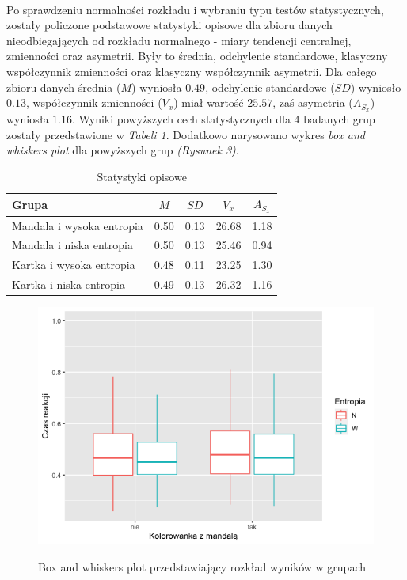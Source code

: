 \documentclass[12pt,a4paper,final,oneside,onecolumn,titlepage]{article}
\begin{document}
\paragraph{}
Po sprawdzeniu normalności rozkładu i wybraniu typu testów statystycznych, zostały policzone podstawowe statystyki opisowe dla zbioru danych nieodbiegających od rozkładu normalnego - miary tendencji centralnej, zmienności oraz asymetrii. Były to średnia, odchylenie standardowe, klasyczny współczynnik zmienności oraz klasyczny współczynnik asymetrii. Dla całego zbioru danych średnia ($M$) wyniosła $0.49$, odchylenie standardowe ($SD$) wyniosło $0.13$, współczynnik zmienności ($V_x$) miał wartość $25.57$, zaś asymetria ($A_{S_{x}}$) wyniosła $1.16$. Wyniki powyższych cech statystycznych dla 4 badanych grup zostały przedstawione w \textit{Tabeli 1}. Dodatkowo narysowano wykres \textit{box and whiskers plot} dla powyższych grup \textit{(Rysunek 3)}.
\begin{table}[H]
\caption{Statystyki opisowe}
\centering
\begin{tabular}{l c c c c}
\hline\hline
Grupa & $M$ & $SD$ & $V_x$ & $A_{S_{x}}$ \\ [0.5ex]
\hline
Mandala i wysoka entropia&0.50&0.13&26.68&1.18 \\
Mandala i niska entropia&0.50&0.13&25.46&0.94 \\
Kartka i wysoka entropia&0.48&0.11&23.25&1.30 \\
Kartka i niska entropia&0.49&0.13&26.32&1.16 \\ [1ex]
\hline
\end{tabular}
\label{Tabela}
\end{table}
\begin{figure}[H]
\centering
\caption{Box and whiskers plot przedstawiający rozkład wyników w grupach}
\includegraphics[scale=0.5]{box1}
\label{Rysunek}
\end{figure}
\end{document}
